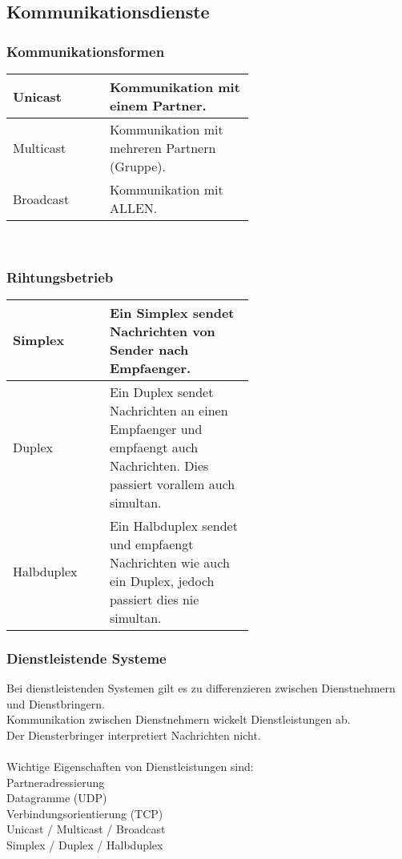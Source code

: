 \documentclass{article}
\newcommand{\tab}{\null \qquad}
\begin{document}
\subsection{Kommunikationsdienste}
\subsubsection{Kommunikationsformen}
\begin{tabular}{|lp{0.6\linewidth}|}
    \hline
    Unicast &
        Kommunikation mit einem Partner.\\
    \hline
    Multicast &
        Kommunikation mit mehreren Partnern (Gruppe).\\
    \hline
    Broadcast &
        Kommunikation mit ALLEN.\\
    \hline
\end{tabular}\\
\subsubsection{Rihtungsbetrieb}
\begin{tabular}{|lp{0.6\linewidth}|}
    \hline
    Simplex & 
        Ein Simplex sendet Nachrichten von Sender nach Empfaenger.\\
    \hline
    Duplex & 
        Ein Duplex sendet Nachrichten an einen Empfaenger und empfaengt auch Nachrichten.
        Dies passiert vorallem auch simultan.\\
    \hline
    Halbduplex & 
        Ein Halbduplex sendet und empfaengt Nachrichten wie auch ein Duplex, jedoch passiert
        dies nie simultan.\\
    \hline
\end{tabular}
\subsubsection{Dienstleistende Systeme}
Bei dienstleistenden Systemen gilt es zu differenzieren zwischen Dienstnehmern und Dienstbringern.\\
Kommunikation zwischen Dienstnehmern wickelt Dienstleistungen ab.\\
Der Diensterbringer interpretiert Nachrichten nicht.\\
\\
Wichtige Eigenschaften von Dienstleistungen sind:\\
\tab Partneradressierung\\
\tab Datagramme (UDP)\\
\tab Verbindungsorientierung (TCP)\\
\tab Unicast / Multicast / Broadcast\\
\tab Simplex / Duplex / Halbduplex
\end{document}
